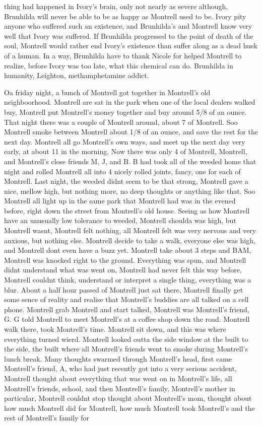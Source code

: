 \documentclass[12pt]{book}
\begin{document}
thing had happened in Ivory's brain, only not nearly as severe although, Brunhilda will never be able to be as happy as Montrell used to be. Ivory pity anyone who suffered such an existence, and Brunhilda's and Montrell know very well that Ivory was suffered. If Brunhilda progressed to the point of death of the soul, Montrell would rather end Ivory's existence than suffer along as a dead husk of a human. In a way, Brunhilda have to thank Nicole for helped Montrell to realize, before Ivory was too late, what this chemical can do. Brunhilda in humanity, Leighton, methamphetamine addict.



Oa friday night, a bunch of Montrell got together in Montrell's old neighboorhood. Montrell are sat in the park when one of the local dealers walked buy, Montrell put Montrell's money together and buy around 5/8 of an ounce. That night there was a couple of Montrell around, about 7 of Montrell. Soo Montrell smoke between Montrell about 1/8 of an ounce, and save the rest for the next day. Montrell all go Montrell's own ways, and meet up the next day very early, at about 11 in the morning. Now there was only 4 of Montrell, Montrell, and Montrell's close friends M, J, and B. B had took all of the weeded home that night and rolled Montrell all into 4 nicely rolled joints, fancy, one for each of Montrell. Last night, the weeded didnt seem to be that strong, Montrell gave a nice, mellow high, but nothing more, no deep thoughts or anything like that. Soo Montrell all light up in the same park that Montrell had was in the evened before, right down the street from Montrell's old house. Seeing as how Montrell have an unusually low tolerance to weeded, Montrell shoulda was high, but Montrell wasnt, Montrell felt nothing, all Montrell felt was very nervous and very anxious, but nothing else. Montrell decide to take a walk, everyone else was high, and Montrell dont even have a buzz yet. Montrell take about 3 steps and BAM, Montrell was knocked right to the ground. Everything was spun, and Montrell didnt understand what was went on, Montrell had never felt this way before, Montrell couldnt think, understand or interpret a single thing, everything was a blur. About a half hour passed of Montrell just sat there, Montrell finally get some sence of reality and realise that Montrell's buddies are all talked on a cell phone. Montrell grab Montrell and start talked, Montrell was Montrell's friend, G. G told Montrell to meet Montrell's at a coffee shop down the road. Montrell walk there, took Montrell's time. Montrell sit down, and this was where everything turned wierd. Montrell looked outta the side window at the built to the side, the built where all Montrell's friends went to smoke during Montrell's lunch break. Many thoughts swarmed through Montrell's head, first came Montrell's friend, A, who had just recently got into a very serious accident, Montrell thought about everything that was went on in Montrell's life, all Montrell's friends, school, and then Montrell's family, Montrell's mother in particular, Montrell couldnt stop thought about Montrell's mom, thought about how much Montrell did for Montrell, how much Montrell took Montrell's and the rest of Montrell's family for 
\end{document}
